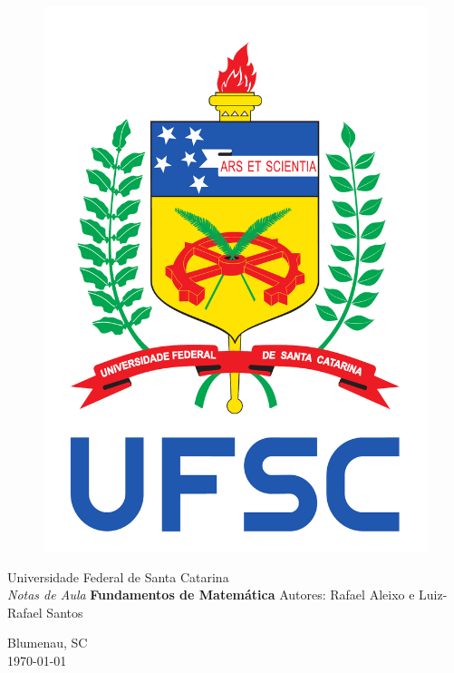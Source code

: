 \thispagestyle{empty}
\begin{figure}[!h]
\centering
\begin{minipage}{0.12\linewidth}
\vspace{-1cm} \includegraphics[width=\textwidth]{brasao_ufsc_color}
\end{minipage}\hspace{.5cm}
\end{figure}
\begin{center}
{\Huge Universidade Federal de Santa Catarina} \\ \vfill
\vfill
{\Large \it Notas de Aula}
\vfill
\vfill
{\LARGE \textbf{Fundamentos de Matem\'atica}}
\vfill
\vfill
{\Large Autores: Rafael Aleixo e Luiz-Rafael Santos}
\vfill
\vfill
\end{center}
\begin{center}
\vfill
{\large Blumenau, SC}\\
{\large \today}
\vfill
\end{center}

